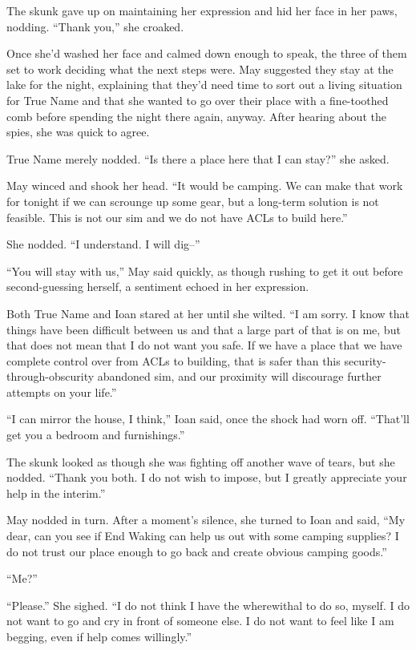 The skunk gave up on maintaining her expression and hid her face in her paws, nodding. ``Thank you,'' she croaked.

Once she'd washed her face and calmed down enough to speak, the three of them set to work deciding what the next steps were. May suggested they stay at the lake for the night, explaining that they'd need time to sort out a living situation for True Name and that she wanted to go over their place with a fine-toothed comb before spending the night there again, anyway. After hearing about the spies, she was quick to agree.

True Name merely nodded. ``Is there a place here that I can stay?'' she asked.

May winced and shook her head. ``It would be camping. We can make that work for tonight if we can scrounge up some gear, but a long-term solution is not feasible. This is not our sim and we do not have ACLs to build here.''

She nodded. ``I understand. I will dig--''

``You will stay with us,'' May said quickly, as though rushing to get it out before second-guessing herself, a sentiment echoed in her expression.

Both True Name and Ioan stared at her until she wilted. ``I am sorry. I know that things have been difficult between us and that a large part of that is on me, but that does not mean that I do not want you safe. If we have a place that we have complete control over from ACLs to building, that is safer than this security-through-obscurity abandoned sim, and our proximity will discourage further attempts on your life.''

``I can mirror the house, I think,'' Ioan said, once the shock had worn off. ``That'll get you a bedroom and furnishings.''

The skunk looked as though she was fighting off another wave of tears, but she nodded. ``Thank you both. I do not wish to impose, but I greatly appreciate your help in the interim.''

May nodded in turn. After a moment's silence, she turned to Ioan and said, ``My dear, can you see if End Waking can help us out with some camping supplies? I do not trust our place enough to go back and create obvious camping goods.''

``Me?''

``Please.'' She sighed. ``I do not think I have the wherewithal to do so, myself. I do not want to go and cry in front of someone else. I do not want to feel like I am begging, even if help comes willingly.''

